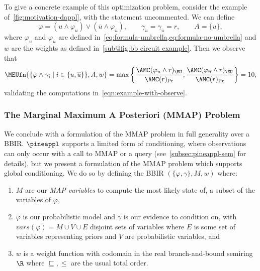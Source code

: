 To give a concrete example of this optimization problem, consider the example of~\cref{fig:motivation-dappl},
with the  statement uncommented.
We can define
\begin{equation}
  \varphi = (u \land \varphi_u) \lor (\overline u \land \varphi_{\overline u}),
  \qquad
  \gamma_u = \gamma_{\overline u} = r,
  \qquad
  A = \{u\},
\end{equation}
where $\varphi_u$ and $\varphi_{\overline u}$ are
defined in~\cref{eq:formula-umbrella,eq:formula-no-umbrella} and $w$ are the weights
as defined in~\cref{sub@fig:bb circuit example}. Then we observe that
{\footnotesize
\begin{equation}
  \MEUfn{\{\varphi \land \gamma_i \mid i \in \{u, \overline u\}\}, A, w}
  = \max \left\{
  \frac{\AMC(\varphi_u \land r)_{\EU}}{\AMC(r)_{\Pr}},
  \frac{\AMC(\varphi_{\overline u} \land r)_{\EU}}{\AMC(r)_{\Pr}}
  \right\}
  = 10,
\end{equation}
}
validating the computations in~\cref{eqn:example-with-observe}.
\subsubsection{The Marginal Maximum A Posteriori (MMAP) Problem}\label{subsubsec:mmap}

We conclude with a formulation of the MMAP problem in full generality over a BBIR.
$\pineappl$ supports a limited form of conditioning, where observations can only occur
with a call to MMAP or a query (see~\cref{subsec:pineappl-sem} for details),
but we present a formulation of the MMAP problem which supports global conditioning.
We do so by defining the
BBIR $(\{\varphi, \gamma\}, M, w)$ where:

\begin{enumerate}[leftmargin=*]
  \item $M$ are our \emph{MAP variables} to compute the most likely state of,
  a subset of the variables of $\varphi$,
  \item $\varphi$ is our probabilistic model and $\gamma$ is our evidence to condition on,
  with $vars(\varphi) = M \cup V \cup E$ disjoint sets of variables where $E$
  is some set of variables representing priors and $V$ are probabilistic variables, and
  \item $w$ is a weight function with codomain in the real branch-and-bound semiring
  $\R$ where $\sqsubseteq, \leq$ are the usual total order.
\end{enumerate}

